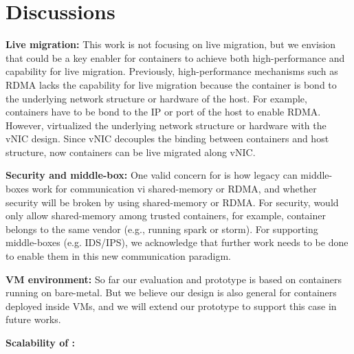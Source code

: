 \section{Discussions} \label{sec:discussion}


\textbf{Live migration:} 
This work is not focusing on live migration, but we envision that \sysname could be a key enabler
for containers to achieve both high-performance and capability for live migration.
Previously, high-performance mechanisms such as RDMA lacks the capability for live migration because
the container is bond to the underlying network structure or hardware of the host.
For example, containers have to be bond to the IP or port of the host to enable RDMA.
However, \sysname virtualized the underlying network structure or hardware with the vNIC design.
Since vNIC decouples the binding between containers and host structure, 
now containers can be live migrated along vNIC.

\textbf{Security and middle-box:}
One valid concern for \sysname is how legacy can middle-boxes work for communication
vi shared-memory or RDMA, and whether security will be broken by using shared-memory or RDMA.
For security, \sysname would only allow shared-memory among trusted containers, for example,
container belongs to the same vendor (e.g., running spark or storm).
For supporting middle-boxes (e.g. IDS/IPS), we acknowledge that further work needs to be done
to enable them in this new communication paradigm.


\textbf{VM environment:}
So far our evaluation and prototype is based on containers running on bare-metal. 
But we believe our design is also general for containers deployed inside VMs, and 
we will extend our prototype to support this case in future works.

\textbf{Scalability of \sysname :}


